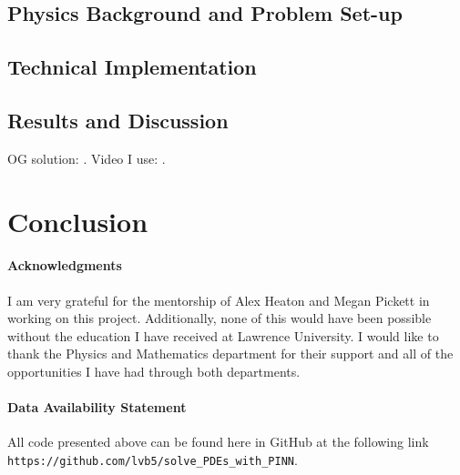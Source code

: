 \documentclass{CUP-JNL-DTM}%
\theoremstyle{definition}
\numberwithin{equation}{section}
\begin{document}
\subsection{Physics Background and Problem Set-up}

\subsection{Technical Implementation}

\subsection{Results and Discussion}

OG solution: \cite{schwarzschildGravitationalFieldMass1999}. Video I use: \cite{eigenchrisRelativity108aSchwarzschild}. 


\section{Conclusion}


\begin{Backmatter}

\paragraph{Acknowledgments}

I am very grateful for the mentorship of Alex Heaton and Megan Pickett in working on this project. Additionally, none of this would have been possible without the education I have received at Lawrence University. I would like to thank the Physics and Mathematics department for their support and all of the opportunities I have had through both departments. 

\paragraph{Data Availability Statement} All code presented above can be found here in GitHub at the following link \texttt{https://github.com/lvb5/solve\_PDEs\_with\_PINN}. 




\end{Backmatter}
\end{document}
